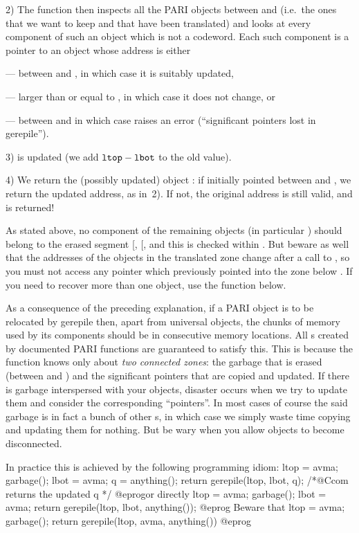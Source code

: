 2) The function then inspects all the PARI objects between  and
 (i.e.~the ones that we want to keep and that have been translated)
and looks at every component of such an object which is not a codeword. Each
such component is a pointer to an object whose address is either

--- between  and , in which case it is suitably updated,

--- larger than or equal to , in which case it does not change, or

--- between  and  in which case 
raises an error (``significant pointers lost in gerepile'').

3)  is updated (we add ${\tt ltop} - {\tt lbot}$ to the old value).

4) We return the (possibly updated) object : if  initially
pointed between  and , we return the updated address, as
in~2). If not, the original address is still valid, and is returned!

As stated above, no component of the remaining objects (in particular
) should belong to the erased segment [, [, and
this is checked within . But beware as well that the addresses
of the objects in the translated zone change after a call to ,
so you must not access any pointer which previously pointed into the zone
below . If you need to recover more than one object, use the
 function below.

As a consequence of the preceding explanation, if a PARI object is to be
relocated by \hbox{gerepile} then, apart from universal objects, the chunks
of memory used by its components should be in consecutive memory locations.
All s created by documented PARI functions are guaranteed to satisfy
this. This is because the  function knows only about \emph{two
connected zones}: the garbage that is erased (between  and
) and the significant pointers that are copied and updated. If
there is garbage interspersed with your objects, disaster occurs when we try
to update them and consider the corresponding ``pointers''. In most cases of
course the said garbage is in fact a bunch of other s, in which case
we simply waste time copying and updating them for nothing. But be wary when
you allow objects to become disconnected.

\noindent In practice this is achieved by the following programming idiom:
\bprog
  ltop = avma; garbage(); lbot = avma; q = anything();
  return gerepile(ltop, lbot, q); /*@Ccom returns the updated q */
@eprog\noindent or directly
\bprog
  ltop = avma; garbage(); lbot = avma;
  return gerepile(ltop, lbot, anything());
@eprog\noindent
Beware that
\bprog
  ltop = avma; garbage();
  return gerepile(ltop, avma, anything())
@eprog

